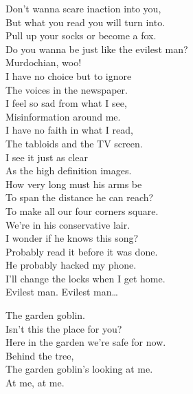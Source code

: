 Don't wanna scare inaction into you, \\
But what you read you will turn into. \\
Pull up your socks or become a fox. \\
Do you wanna be just like the evilest man? \\
Murdochian, woo! \\

I have no choice but to ignore \\
The voices in the newspaper. \\
I feel so sad from what I see, \\
Misinformation around me. \\

I have no faith in what I read, \\
The tabloids and the TV screen. \\
I see it just as clear \\
As the high definition images. \\

How very long must his arms be \\
To span the distance he can reach? \\
To make all our four corners square. \\
We're in his conservative lair. \\

I wonder if he knows this song? \\
Probably read it before it was done. \\
He probably hacked my phone. \\
I'll change the locks when I get home. \\

Evilest man. Evilest man… \\





The garden goblin. \\

Isn't this the place for you? \\
Here in the garden we're safe for now. \\
Behind the tree, \\
The garden goblin's looking at me. \\
At me, at me. \\

